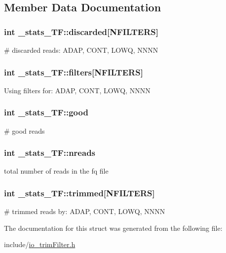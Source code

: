 \subsection{Member Data Documentation}
\hypertarget{struct__stats__TF_a876a430dbbb78e3b03f9e7088da26618}{
\subsubsection[{discarded}]{\setlength{\rightskip}{0pt plus 5cm}int \+\_\+stats\+\_\+\+T\+F\+::discarded\mbox{[}{\bf N\+F\+I\+L\+T\+E\+R\+S}\mbox{]}}}\label{struct__stats__TF_a876a430dbbb78e3b03f9e7088da26618}
\# discarded reads\+: A\+D\+A\+P, C\+O\+N\+T, L\+O\+W\+Q, N\+N\+N\+N \hypertarget{struct__stats__TF_a47d4caef2878e2c10e7571cfdd2d9619}{
\subsubsection[{filters}]{\setlength{\rightskip}{0pt plus 5cm}int \+\_\+stats\+\_\+\+T\+F\+::filters\mbox{[}{\bf N\+F\+I\+L\+T\+E\+R\+S}\mbox{]}}}\label{struct__stats__TF_a47d4caef2878e2c10e7571cfdd2d9619}
Using filters for\+: A\+D\+A\+P, C\+O\+N\+T, L\+O\+W\+Q, N\+N\+N\+N \hypertarget{struct__stats__TF_a4d36ddc878d561051a0f9464df2e0911}{
\subsubsection[{good}]{\setlength{\rightskip}{0pt plus 5cm}int \+\_\+stats\+\_\+\+T\+F\+::good}}\label{struct__stats__TF_a4d36ddc878d561051a0f9464df2e0911}
\# good reads \hypertarget{struct__stats__TF_a2a3993588191eb9f03416cce4fb1862f}{
\subsubsection[{nreads}]{\setlength{\rightskip}{0pt plus 5cm}int \+\_\+stats\+\_\+\+T\+F\+::nreads}}\label{struct__stats__TF_a2a3993588191eb9f03416cce4fb1862f}
total number of reads in the fq file \hypertarget{struct__stats__TF_a399de2eb5fd452f019d5c8d23bae0651}{
\subsubsection[{trimmed}]{\setlength{\rightskip}{0pt plus 5cm}int \+\_\+stats\+\_\+\+T\+F\+::trimmed\mbox{[}{\bf N\+F\+I\+L\+T\+E\+R\+S}\mbox{]}}}\label{struct__stats__TF_a399de2eb5fd452f019d5c8d23bae0651}
\# trimmed reads by\+: A\+D\+A\+P, C\+O\+N\+T, L\+O\+W\+Q, N\+N\+N\+N 

The documentation for this struct was generated from the following file\+:\begin{DoxyCompactItemize}
\item 
include/\hyperlink{io__trimFilter_8h}{io\+\_\+trim\+Filter.\+h}\end{DoxyCompactItemize}
